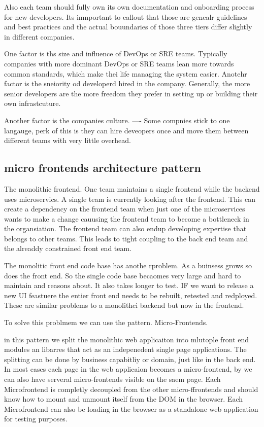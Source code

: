 \documentclass[a4paper, 11pt]{book}
\begin{document}
    Also each team should fully own its own documentation and onboarding process for new developers.
    Its imnportant to callout that those are genealr guidelines and best practices and the actual bouundaries of those three tiers differ slightly in different companies.

    One factor is ths size and influence of DevOps or SRE teams.
    Typically companies with more dominant DevOps or SRE teams lean more towards common standards, which make thei life managing the system easier.
    Anotehr factor is the sneiority od developerd hired in the company.
    Generally, the more senior developers are the more freedom they prefer in setting up or building their own infrastcuture.

    Another factor is the companies culture.
    ---- Some compnies stick to one langauge, perk of this is they can hire deveopers once and move them between different teams with very little overhead.

    \subsection{micro frontends architecture pattern}
    The monolithic frontend. One team maintains a single frontend while the backend uses microservics. A single team is currently looking after the frontend.
    This can create a dependency on the frontend team when just one of the microservices wants to make a change cauusing the frontend team to become a bottleneck in the organsiation.
    The frontend team can also endup developing expertise that belongs to other teams.
    This leads to tight coupling to the back end team and the alreaddy constrained front end team.

    The monolitic front end code base has anothe rproblem.
    As a buinsess grows so does the front end.
    So the single code base becaomes very large and hard to maintain and reasons about.
    It also takes longer to test.
    IF we want to release a new UI feastuere the entier front end needs to be rebuilt, retested and redployed.
    These are similar problems to a monolithci backend but now in the frontend.

    To solve this problmem we can use the pattern. Micro-Frontends.

    in this pattern we split the monolithic web applicaiton into mlutople front end modules an libarres that act as an indepenedent single page applications.
    The splitting can be done by business capabitliy or domain, just like in the back end.
    In most cases each page in the web applicaion becomes a micro-frontend, by we can also have serveral micro-frontends visible on the saem page.
    Each Microfrontend is completly decoupled from the other micro-ffrontends and should know how to mount and unmount itself from the DOM in the browser.
    Each Microfrontend can also be loading in the browser as a standalone web application for testing purposes.
\end{document}
